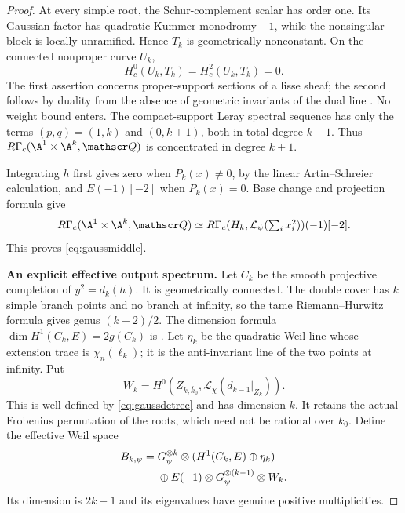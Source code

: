 \begin{proof}
At every simple root, the Schur-complement scalar has order
one. Its Gaussian factor has quadratic Kummer monodromy
$-1$, while the nonsingular block is locally unramified.
Hence $T_k$ is geometrically nonconstant. On the connected
nonproper curve $U_k$,
\[
 H_c^0(U_k,T_k)=H_c^2(U_k,T_k)=0.
\]
The first assertion concerns proper-support sections of a
lisse sheaf; the second follows by duality from the absence
of geometric invariants of the dual line
\cite[\emph{Sommes trig.}, 1.18(b)--(d),
pp.~178--179]{SGA45}. No weight bound enters.
The compact-support Leray spectral sequence has only the
terms $(p,q)=(1,k)$ and $(0,k+1)$, both in total degree
$k+1$. Thus $R\Gamma_c(\A^1\times\A^k,\mathscr Q)$ is
concentrated in degree $k+1$.

Integrating $h$ first gives zero when $P_k(x)\ne0$, by the
linear Artin--Schreier calculation, and $E(-1)[-2]$ when
$P_k(x)=0$. Base change and projection formula give
\[
 R\Gamma_c(\A^1\times\A^k,\mathscr Q)
 \simeq
 R\Gamma_c(H_k,\mathcal L_\psi(\textstyle\sum_i x_i^2))(-1)[-2].
\]
This proves \eqref{eq:gaussmiddle}.

\par\smallskip\noindent\textbf{An explicit effective output spectrum.}\quad
Let $C_k$ be the smooth projective completion of
$y^2=d_k(h)$. It is geometrically connected.
The double cover has $k$ simple branch points and no
branch at infinity, so the tame Riemann--Hurwitz formula
\cite[Lemmas~53.12.2 and~53.12.4, tags~0C1D and~0C1F]{StacksRH}
gives genus $(k-2)/2$. The dimension formula
$\dim H^1(C_k,E)=2g(C_k)$ is
\cite[Proposition~14.2, p.~90]{Milne}. Let $\eta_k$ be the quadratic Weil line whose
extension trace is $\chi_n(\ell_k)$; it is the anti-invariant
line of the two points at infinity. Put
\[
 W_k=H^0(Z_{k,\bar k_0},
             \mathcal L_\chi(d_{k-1}|_{Z_k})).
\]
This is well defined by \eqref{eq:gaussdetrec} and has
dimension $k$. It retains the actual Frobenius permutation
of the roots, which need not be rational over $k_0$.
Define the effective Weil space
\begin{align}
 B_{k,\psi}={}&G_\psi^{\otimes k}\otimes
                 (H^1(C_k,E)\oplus\eta_k)\notag\\
 &\oplus E(-1)\otimes G_\psi^{\otimes(k-1)}\otimes W_k .
 \label{eq:gaussoutput}
\end{align}
Its dimension is $2k-1$ and its eigenvalues have genuine
positive multiplicities.


\end{proof}
